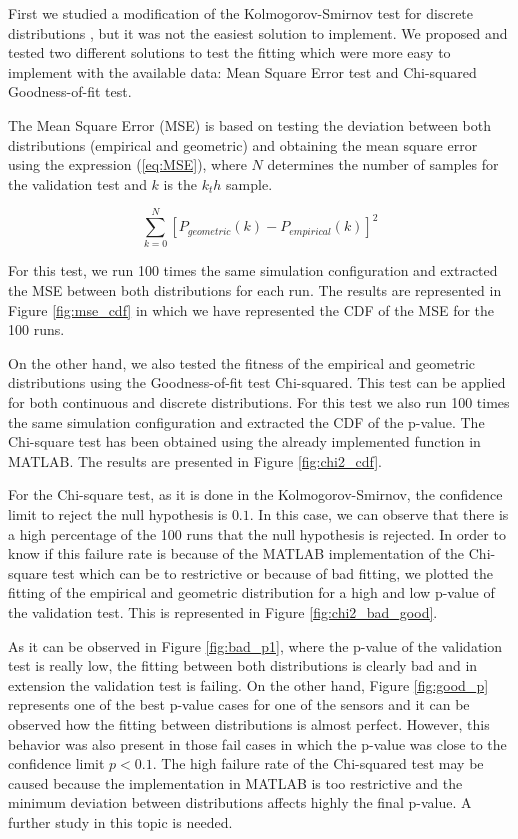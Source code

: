 First we studied a modification of the Kolmogorov-Smirnov test for discrete distributions \cite{ks_discrete}, but it was not the easiest solution to implement. We proposed and tested two different solutions to test the fitting which were more easy to implement with the available data: Mean Square Error test and Chi-squared Goodness-of-fit test.

The Mean Square Error (\acs{MSE}) is based on testing the deviation between both distributions (empirical and geometric) and obtaining the mean square error using the expression (\ref{eq:MSE}), where $N$ determines the number of samples for the validation test and $k$ is the $k_th$ sample.

\begin{equation}
	\sum_{k=0}^{N}[P_{geometric}(k) - P_{empirical}(k)]^2
	\label{eq:MSE}
\end{equation}


For this test, we run 100 times the same simulation configuration and extracted the \acs{MSE} between both distributions for each run. The results are represented in Figure \ref{fig:mse_cdf} in which we have represented the CDF of the MSE for the 100 runs.

On the other hand, we also tested the fitness of the empirical and geometric distributions using the Goodness-of-fit test Chi-squared. This test can be applied for both continuous and discrete distributions. For this test we also run 100 times the same simulation configuration and extracted the CDF of the p-value. The Chi-square test has been obtained using the already implemented function in MATLAB. The results are presented in Figure \ref{fig:chi2_cdf}.

For the Chi-square test, as it is done in the Kolmogorov-Smirnov, the confidence limit to reject the null hypothesis is $0.1$. In this case, we can observe that there is a high percentage of the 100 runs that the null hypothesis is rejected. In order to know if this failure rate is because of the MATLAB implementation of the Chi-square test which can be to restrictive or because of bad fitting, we plotted the fitting of the empirical and geometric distribution for a high and low p-value of the validation test. This is represented in Figure \ref{fig:chi2_bad_good}.

As it can be observed in Figure \ref{fig:bad_p1}, where the p-value of the validation test is really low, the fitting between both distributions is clearly bad and in extension the validation test is failing. On the other hand, Figure \ref{fig:good_p} represents one of the best p-value cases for one of the sensors and it can be observed how the fitting between distributions is almost perfect. However, this behavior was also present in those fail cases in which the p-value was close to the confidence limit $p<0.1$. The high failure rate of the Chi-squared test may be caused because the implementation in MATLAB is too restrictive and the minimum deviation between distributions affects highly the final p-value. A further study in this topic is needed.

